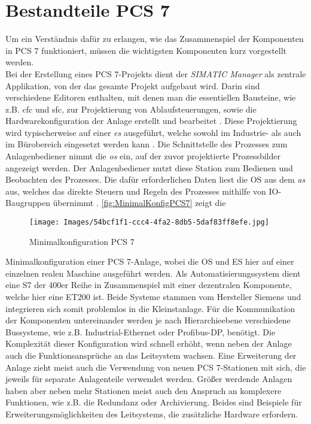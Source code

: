 \section{Bestandteile PCS 7}
Um ein Verständnis dafür zu erlangen, wie das Zusammenspiel der Komponenten in PCS 7 funktioniert, müssen die wichtigsten Komponenten kurz vorgestellt werden.\medskip\\
Bei der Erstellung eines PCS 7-Projekts dient der \textit{SIMATIC Manager} als zentrale Applikation, von der das gesamte Projekt aufgebaut wird. Darin sind verschiedene Editoren enthalten, mit denen man die essentiellen Bausteine, wie z.B. \acrfull{cfc} und \acrfull{sfc}, zur Projektierung von Ablaufsteuerungen, sowie die Hardwarekonfiguration der Anlage erstellt und bearbeitet \cite[S.~20]{SiemensAG2018b}. Diese Projektierung wird typischerweise auf einer \textit{\acrfull{es}} ausgeführt, welche sowohl im Industrie- als auch im Bürobereich eingesetzt werden kann \cite[S.~11]{SiemensAG2017}.
Die Schnittstelle des Prozesses zum Anlagenbediener nimmt die \textit{\acrfull{os}} ein, auf der zuvor projektierte Prozessbilder angezeigt werden. Der Anlagenbediener nutzt diese Station zum Bedienen und Beobachten des Prozesses. Die dafür erforderlichen Daten liest die OS aus dem \textit{\acrfull{as}} aus, welches das direkte Steuern und Regeln des Prozesses mithilfe von  IO- Baugruppen übernimmt \cite[S.~145]{SiemensAG2018b}. \autoref{fig:MinimalKonfigPCS7} zeigt die 
\begin{wrapfigure}[13]{ht}[0cm]{7.7cm}
    \texttt{[image: Images/54bcf1f1-ccc4-4fa2-8db5-5daf83ff8efe.jpg]}\caption[Minimalkonfiguration PCS 7]{Minimalkonfiguration PCS 7 \cite[S.~11]{SiemensAG2020}}
    \label{fig:MinimalKonfigPCS7}
    \centering
\end{wrapfigure}
Minimalkonfiguration einer PCS 7-Anlage, wobei die OS und ES hier auf einer einzelnen realen Maschine ausgeführt werden. Als Automatisierungssystem dient eine S7 der 400er Reihe in Zusammenspiel mit einer dezentralen Komponente, welche hier eine ET200 ist. Beide Systeme stammen vom Hersteller Siemens und integrieren sich somit problemlos in die Kleinstanlage. Für die Kommunikation der Komponenten untereinander werden je nach Hierarchieebene verschiedene Bussysteme, wie z.B. Industrial-Ethernet oder Profibus-DP, benötigt. Die Komplexität dieser Konfiguration wird schnell erhöht, wenn neben der Anlage auch die Funktionsansprüche an das Leitsystem wachsen. Eine Erweiterung der Anlage zieht meist auch die Verwendung von neuen PCS 7-Stationen mit sich, die jeweils für separate Anlagenteile verwendet werden. Größer werdende Anlagen haben aber neben mehr Stationen meist auch den Anspruch an komplexere Funktionen, wie z.B. die Redundanz oder Archivierung. Beides sind Beispiele für Erweiterungsmöglichkeiten des Leitsystems, die zusätzliche Hardware erfordern. 

